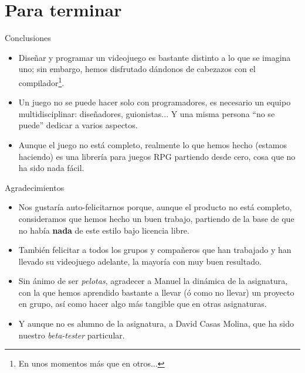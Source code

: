 \documentclass[9pt,xcolor=svgnames]{beamer}
\begin{document}
 \section{Para terminar}
 \begin{frame}{Conclusiones}
   \transdissolve
   \begin{itemize}
   \item Diseñar y programar un videojuego es bastante distinto a lo que se
     imagina uno; sin embargo, hemos disfrutado dándonos de cabezazos con
     el compilador\footnote{En unos momentos más que en otros...}.
   \item Un juego no se puede hacer solo con programadores, es necesario un
	 equipo multidisciplinar: diseñadores, guionistas... Y una misma
	 persona ``no se puede'' dedicar a varios aspectos.
   \item Aunque el juego no está completo, realmente lo que hemos hecho 
     (estamos haciendo) es una librería para juegos RPG partiendo desde
     cero, cosa que no ha sido nada fácil.
   \end{itemize}
 \end{frame}

 \begin{frame}{Agradecimientos}
   \transdissolve
   \begin{itemize}
   \item Nos gustaría auto-felicitarnos porque, aunque el producto no está 
     completo, consideramos que hemos hecho un buen trabajo, partiendo de
     la base de que no había \textbf{nada} de este estilo bajo licencia libre.
   \item También felicitar a todos los grupos y compañeros que han trabajado
     y han llevado su videojuego adelante, la mayoría con muy buen resultado.
   \item Sin ánimo de ser \textit{pelotas}, agradecer a Manuel la dinámica de
     la asignatura, con la que hemos aprendido bastante a llevar (ó como no
     llevar) un proyecto en grupo, así como hacer algo más tangible que
     en otras asignaturas.
   \item Y aunque no es alumno de la asignatura, a David Casas Molina, que ha
     sido nuestro \textit{beta-tester} particular.
   \end{itemize}
 \end{frame}
\end{document}
